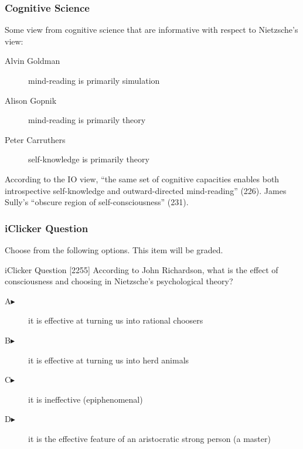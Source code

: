 \documentclass[xcolor=dvipsnames]{beamer}
\begin{document}
\begin{frame}
  \frametitle{Cognitive Science}
  Some view from cognitive science that are informative with respect
  to Nietzsche's view:
  \begin{description}
  \item[Alvin Goldman] mind-reading is primarily simulation
  \item[Alison Gopnik] mind-reading is primarily theory
  \item[Peter Carruthers] self-knowledge is primarily theory
  \end{description}
According to the IO view, ``the same set of cognitive capacities
enables both introspective self-knowledge and outward-directed
mind-reading'' (226). James Sully's ``obscure region of
self-consciousness'' (231).
\end{frame}

\begin{frame}
  \frametitle{iClicker Question}
Choose from the following options. This item will be graded.
\begin{block}{iClicker Question}
[2255] According to John Richardson, what is the effect of
consciousness and choosing in Nietzsche's psychological theory?
\end{block}
\begin{description}
\item[A\hspace{.2in}$\blacktriangleright$] it is effective at turning us into rational choosers
\item[B\hspace{.2in}$\blacktriangleright$] it is effective at turning us into herd animals
\item[C\hspace{.2in}$\blacktriangleright$] it is ineffective (epiphenomenal)
\item[D\hspace{.2in}$\blacktriangleright$] it is the effective feature of an aristocratic strong person (a master)
\end{description}
\end{frame}
\end{document}
